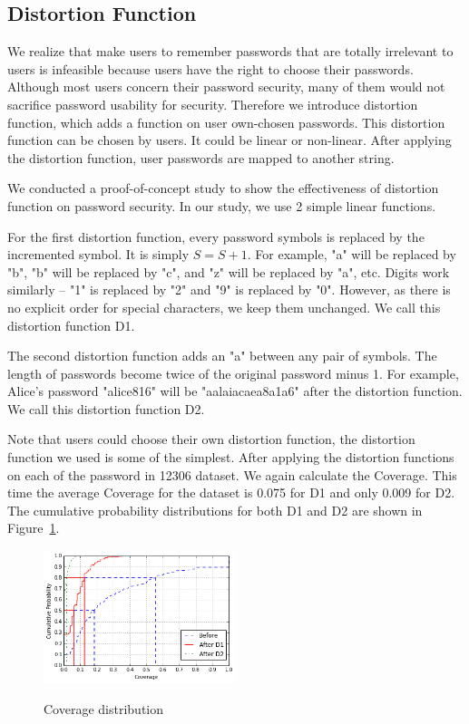 \documentclass{sig-alternate}
\begin{document}
\subsection{Distortion Function}
We realize that make users to remember passwords that are totally irrelevant to users is infeasible because users have the right to choose their passwords. Although most users concern their password security, many of them would not sacrifice password usability for security. Therefore we introduce distortion function, which adds a function on user own-chosen passwords. This distortion function can be chosen by users. It could be linear or non-linear. After applying the distortion function, user passwords are mapped to another string. 

We conducted a proof-of-concept study to show the effectiveness of distortion function on password security. In our study, we use 2 simple linear functions. 

For the first distortion function, every password symbols is replaced by the incremented symbol. It is simply $S = S + 1$. For example, "a" will be replaced by "b", "b" will be replaced by "c", and "z" will be replaced by "a", etc. Digits work similarly -- "1" is replaced by "2" and "9" is replaced by "0". However, as there is no explicit order for special characters, we keep them unchanged. We call this distortion function D1.

The second distortion function adds an "a" between any pair of symbols. The length of passwords become twice of the original password minus 1. For example, Alice's password "alice816" will be "aalaiacaea8a1a6" after the distortion function. We call this distortion function D2.

Note that users could choose their own distortion function, the distortion function we used is some of the simplest. After applying the distortion functions on each of the password in 12306 dataset. We again calculate the Coverage. This time the average Coverage for the dataset is 0.075 for D1 and only 0.009 for D2. The cumulative probability distributions for both D1 and D2 are shown in Figure~\ref{f4}. 
\begin{figure}[h!]
\centering
  \caption{Coverage distribution}{}
  \label{f4}
  \centering
    \includegraphics[width=0.5\textwidth]{fig/dist1}
\end{figure}
\end{document}
